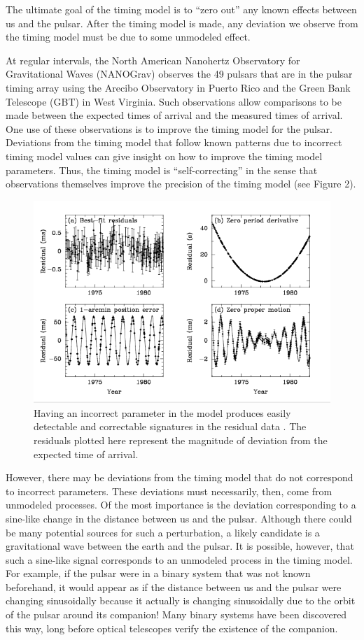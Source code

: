 \documentclass[12pt]{article}
\begin{document}
The ultimate goal of the timing model is to ``zero out'' any known effects between
us and the pulsar. After the timing model is made, any deviation we observe from
the timing model must be due to some unmodeled effect.

At regular intervals, the North American Nanohertz Observatory for Gravitational
Waves (NANOGrav) observes the 49 pulsars that are in the pulsar timing array
using the Arecibo Observatory in Puerto Rico and the Green Bank Telescope (GBT)
in West Virginia. Such observations allow comparisons to be made between the
expected times of arrival and the measured times of arrival. One use of these
observations is to improve the timing model for the pulsar. Deviations from the
timing model that follow known patterns due to incorrect timing model values can
give insight on how to improve the timing model parameters.  Thus, the timing
model is ``self-correcting'' in the sense that observations themselves improve
the precision of the timing model (see Figure 2).

\begin{figure}
\caption{Having an incorrect parameter in the model produces easily detectable
    and correctable signatures in the residual data \cite{Lorimer2008}. The
    residuals plotted here represent the magnitude of deviation from the
    expected time of arrival.}
\includegraphics[width=\textwidth]{./figures/bad_timing.png}
\end{figure}


However, there may be deviations from the timing model that do not correspond to
incorrect parameters. These deviations must necessarily, then, come from
unmodeled processes. Of the most importance is the deviation corresponding to a
sine-like change in the distance between us and the pulsar. Although there could
be many potential sources for such a perturbation, a likely candidate is a
gravitational wave between the earth and the pulsar. It is possible, however,
that such a sine-like signal corresponds to an unmodeled process in the timing
model. For example, if the pulsar were in a binary system that was not known
beforehand, it would appear as if the distance between us and the pulsar were
changing sinusoidally because it actually is changing sinusoidally due to the
orbit of the pulsar around its companion! Many binary systems have been
discovered this way, long before optical telescopes verify the existence of
the companion.
\end{document}
